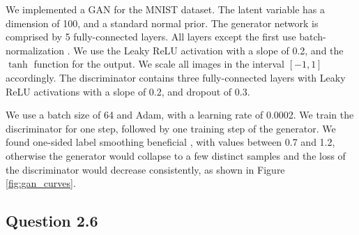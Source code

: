 \documentclass{article}
\begin{document}
We implemented a GAN for the MNIST dataset. The latent variable has a dimension of 100, and a standard normal prior. The generator network is comprised by 5 fully-connected layers. All layers except the first use batch-normalization \cite{ioffe205batchnorm}. We use the Leaky ReLU activation with a slope of 0.2, and the $\tanh$ function for the output. We scale all images in the interval $[-1, 1]$ accordingly. The discriminator contains three fully-connected layers with Leaky ReLU activations with a slope of 0.2, and dropout of 0.3.

We use a batch size of 64 and Adam, with a learning rate of 0.0002. We train the discriminator for one step, followed by one training step of the generator. We found one-sided label smoothing beneficial \cite{salimans2016improved}, with values  between 0.7 and 1.2, otherwise the generator would collapse to a few distinct samples and the loss of the discriminator would decrease consistently, as shown in Figure \ref{fig:gan_curves}.

\subsection*{Question 2.6}
\end{document}
